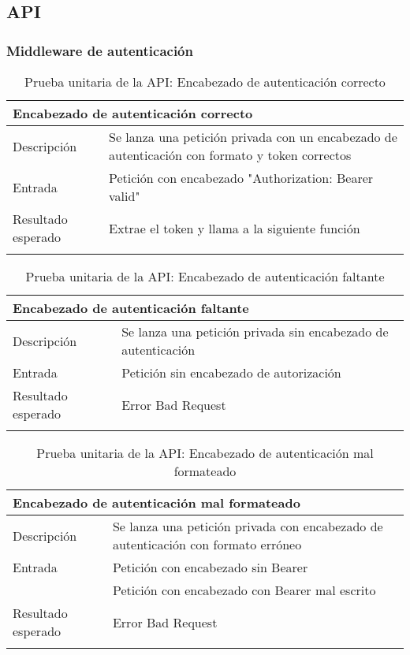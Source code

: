 \subsection{API}

\subsubsection{Middleware de autenticación}

\begin{longtable}{|p{} p{}|}
    \hline
    \multicolumn{2}{|l|}{\textbf{Encabezado de autenticación correcto}} \\ \hline 
    Descripción                 & Se lanza una petición privada con un encabezado de autenticación con formato y token correctos \\ \hline
    Entrada                     & Petición con encabezado "Authorization: Bearer valid" \\ \hline
    Resultado esperado          & Extrae el token y llama a la siguiente función \\ \hline
    \caption{Prueba unitaria de la API: Encabezado de autenticación correcto}
    \label{cp:u:api:encabezado_correcto}
\end{longtable}

\begin{longtable}{|p{} p{}|}
    \hline
    \multicolumn{2}{|l|}{\textbf{Encabezado de autenticación faltante}} \\ \hline 
    Descripción                 & Se lanza una petición privada sin encabezado de autenticación \\ \hline
    Entrada                     & Petición sin encabezado de autorización \\ \hline
    Resultado esperado          & Error Bad Request \\ \hline
    \caption{Prueba unitaria de la API: Encabezado de autenticación faltante}
    \label{cp:u:api:encabezado_faltante}
\end{longtable}

\begin{longtable}{|p{} p{}|}
    \hline
    \multicolumn{2}{|l|}{\textbf{Encabezado de autenticación mal formateado}} \\ \hline 
    Descripción                 & Se lanza una petición privada con encabezado de autenticación con formato erróneo \\ \hline
    Entrada                     & Petición con encabezado sin Bearer \\ 
                                & Petición con encabezado con Bearer mal escrito \\ \hline
    Resultado esperado          & Error Bad Request \\ \hline
    \caption{Prueba unitaria de la API: Encabezado de autenticación mal formateado}
    \label{cp:u:api:encabezado_mal_formateado}
\end{longtable}

